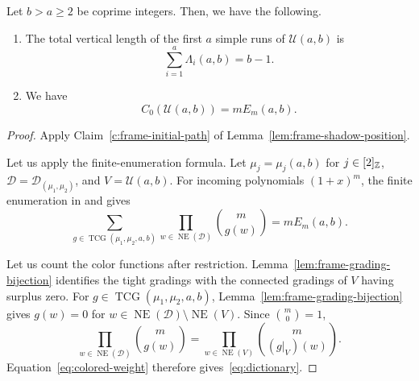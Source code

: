 \begin{proposition}\label{prop:frame}
Let $b>a\ge2$ be coprime integers.
Then, we have the following.

\begin{enumerate}
\item\label{c:frame-runs} The total vertical length of the first $a$ simple runs of $\mathcal U(a,b)$ is
\[
 \sum_{i=1}^{a}\Lambda_i(a,b)=b-1.
\]
\item\label{c:frame-dictionary} We have
\begin{equation}\label{eq:dictionary}
 C_0(\mathcal{U}(a,b))=mE_m(a,b).
\end{equation}
\end{enumerate}
\end{proposition}
\begin{proof}
 Apply Claim~\ref{c:frame-initial-path} of Lemma~\ref{lem:frame-shadow-position}.

 Let us apply the finite-enumeration formula.
Let $\mu_j=\mu_j(a,b)$ for $j\in[2]_{\mathbb Z}$, $\mathcal D=\mathcal D_{(\mu_1,\mu_2)}$, and $V=\mathcal U(a,b)$.
For incoming polynomials $(1+x)^m$, the finite enumeration in
\cite[Theorems 3.2 and 4.10]{B} and \cite[Theorem 12.1]{RW} gives
\[
 \sum_{g\in\operatorname{TCG}(\mu_1,\mu_2,a,b)}
       \prod_{w\in\operatorname{NE}(\mathcal D)}\binom{m}{g(w)}
 =mE_m(a,b).
\]

Let us count the color functions after restriction.
Lemma~\ref{lem:frame-grading-bijection} identifies the tight gradings with the connected gradings of $V$ having surplus zero.
For $g\in\operatorname{TCG}(\mu_1,\mu_2,a,b)$, Lemma~\ref{lem:frame-grading-bijection} gives $g(w)=0$ for $w\in\operatorname{NE}(\mathcal D)\setminus\operatorname{NE}(V)$. Since $\binom m0=1$,
\[
 \prod_{w\in\operatorname{NE}(\mathcal D)}\binom m{g(w)}
 =\prod_{w\in\operatorname{NE}(V)}\binom m{(g|_V)(w)}.
\]
Equation~\eqref{eq:colored-weight} therefore gives~\eqref{eq:dictionary}.
\end{proof}

